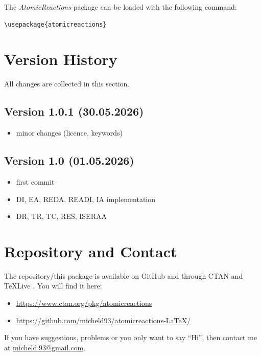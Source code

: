 \documentclass[
	a4paper,
	parskip=half,
    pagesize=auto,      		%
    listof=totoc,   		%
    bibliography=totoc,
	11pt
]{scrartcl}
\begin{document}
The \textit{AtomicReactions}-package can be loaded with the following command: 

\begin{lstlisting}
\usepackage{atomicreactions}
\end{lstlisting}


\section{Version History}

All changes are collected in this section.

\subsection{Version 1.0.1 (30.05.2026)}

\begin{itemize}
    \item minor changes (licence, keywords)
\end{itemize}

\subsection{Version 1.0 (01.05.2026)}

\begin{itemize}
    \item first commit
    \item DI, EA, REDA, READI, IA implementation
    \item DR, TR, TC, RES, ISERAA
\end{itemize}

\section{Repository and Contact}

The repository/this package is available on GitHub and through CTAN \cite{ctan} and TeXLive \cite{texlive}. You will find it here:


\begin{itemize}
    \item \url{https://www.ctan.org/pkg/atomicreactions}
    \item \url{https://github.com/micheld93/atomicreactions-LaTeX/}  
\end{itemize}


If you have suggestions, problems or you only want to say ``Hi'', then contact me at \href{mailto:micheld.93@ gmail.com}{micheld.93@gmail.com}.
\end{document}
